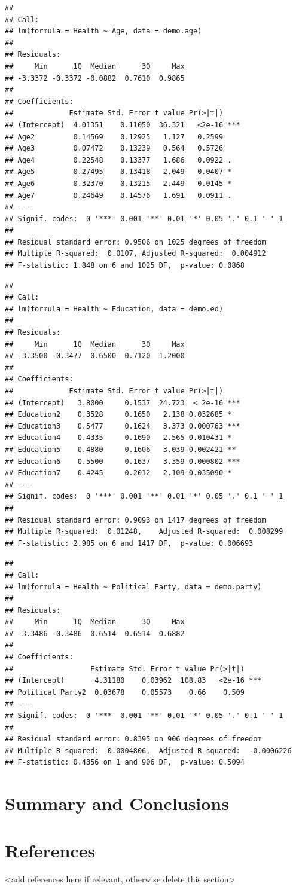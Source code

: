 \documentclass[
  12pt,
]{article}
\begin{document}
\begin{verbatim}
## 
## Call:
## lm(formula = Health ~ Age, data = demo.age)
## 
## Residuals:
##     Min      1Q  Median      3Q     Max 
## -3.3372 -0.3372 -0.0882  0.7610  0.9865 
## 
## Coefficients:
##             Estimate Std. Error t value Pr(>|t|)    
## (Intercept)  4.01351    0.11050  36.321   <2e-16 ***
## Age2         0.14569    0.12925   1.127   0.2599    
## Age3         0.07472    0.13239   0.564   0.5726    
## Age4         0.22548    0.13377   1.686   0.0922 .  
## Age5         0.27495    0.13418   2.049   0.0407 *  
## Age6         0.32370    0.13215   2.449   0.0145 *  
## Age7         0.24649    0.14576   1.691   0.0911 .  
## ---
## Signif. codes:  0 '***' 0.001 '**' 0.01 '*' 0.05 '.' 0.1 ' ' 1
## 
## Residual standard error: 0.9506 on 1025 degrees of freedom
## Multiple R-squared:  0.0107, Adjusted R-squared:  0.004912 
## F-statistic: 1.848 on 6 and 1025 DF,  p-value: 0.0868
\end{verbatim}

\begin{verbatim}
## 
## Call:
## lm(formula = Health ~ Education, data = demo.ed)
## 
## Residuals:
##     Min      1Q  Median      3Q     Max 
## -3.3500 -0.3477  0.6500  0.7120  1.2000 
## 
## Coefficients:
##             Estimate Std. Error t value Pr(>|t|)    
## (Intercept)   3.8000     0.1537  24.723  < 2e-16 ***
## Education2    0.3528     0.1650   2.138 0.032685 *  
## Education3    0.5477     0.1624   3.373 0.000763 ***
## Education4    0.4335     0.1690   2.565 0.010431 *  
## Education5    0.4880     0.1606   3.039 0.002421 ** 
## Education6    0.5500     0.1637   3.359 0.000802 ***
## Education7    0.4245     0.2012   2.109 0.035090 *  
## ---
## Signif. codes:  0 '***' 0.001 '**' 0.01 '*' 0.05 '.' 0.1 ' ' 1
## 
## Residual standard error: 0.9093 on 1417 degrees of freedom
## Multiple R-squared:  0.01248,    Adjusted R-squared:  0.008299 
## F-statistic: 2.985 on 6 and 1417 DF,  p-value: 0.006693
\end{verbatim}

\begin{verbatim}
## 
## Call:
## lm(formula = Health ~ Political_Party, data = demo.party)
## 
## Residuals:
##     Min      1Q  Median      3Q     Max 
## -3.3486 -0.3486  0.6514  0.6514  0.6882 
## 
## Coefficients:
##                  Estimate Std. Error t value Pr(>|t|)    
## (Intercept)       4.31180    0.03962  108.83   <2e-16 ***
## Political_Party2  0.03678    0.05573    0.66    0.509    
## ---
## Signif. codes:  0 '***' 0.001 '**' 0.01 '*' 0.05 '.' 0.1 ' ' 1
## 
## Residual standard error: 0.8395 on 906 degrees of freedom
## Multiple R-squared:  0.0004806,  Adjusted R-squared:  -0.0006226 
## F-statistic: 0.4356 on 1 and 906 DF,  p-value: 0.5094
\end{verbatim}

\newpage

\hypertarget{summary-and-conclusions}{%
\section{Summary and Conclusions}\label{summary-and-conclusions}}

\newpage

\hypertarget{references}{%
\section{References}\label{references}}

\textless add references here if relevant, otherwise delete this
section\textgreater{}
\end{document}
